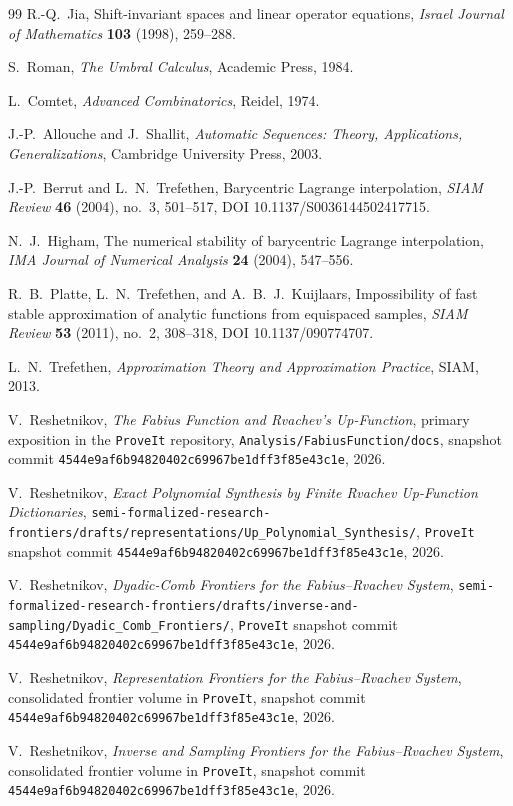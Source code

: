 \documentclass[11pt,oneside]{article}
\numberwithin{equation}{section}
\theoremstyle{definition}
\theoremstyle{remark}
\newcommand{\repo}{\nolinkurl{Analysis/FabiusFunction/docs}}
\begin{document}
\begin{thebibliography}{99}
R.-Q.~Jia,
\newblock Shift-invariant spaces and linear operator equations,
\newblock \emph{Israel Journal of Mathematics} \textbf{103} (1998),
259--288.

S.~Roman,
\newblock \emph{The Umbral Calculus},
\newblock Academic Press, 1984.

L.~Comtet,
\newblock \emph{Advanced Combinatorics},
\newblock Reidel, 1974.

J.-P.~Allouche and J.~Shallit,
\newblock \emph{Automatic Sequences: Theory, Applications,
Generalizations},
\newblock Cambridge University Press, 2003.

J.-P.~Berrut and L.~N.~Trefethen,
\newblock Barycentric Lagrange interpolation,
\newblock \emph{SIAM Review} \textbf{46} (2004), no.~3, 501--517,
DOI 10.1137/S0036144502417715.

N.~J.~Higham,
\newblock The numerical stability of barycentric Lagrange interpolation,
\newblock \emph{IMA Journal of Numerical Analysis} \textbf{24} (2004),
547--556.

R.~B.~Platte, L.~N.~Trefethen, and A.~B.~J.~Kuijlaars,
\newblock Impossibility of fast stable approximation of analytic functions
from equispaced samples,
\newblock \emph{SIAM Review} \textbf{53} (2011), no.~2, 308--318,
DOI 10.1137/090774707.

L.~N.~Trefethen,
\newblock \emph{Approximation Theory and Approximation Practice},
\newblock SIAM, 2013.

V.~Reshetnikov,
\newblock \emph{The Fabius Function and Rvachev's Up-Function},
\newblock primary exposition in the \texttt{ProveIt} repository,
\repo, snapshot commit
\nolinkurl{4544e9af6b94820402c69967be1dff3f85e43c1e}, 2026.

V.~Reshetnikov,
\newblock \emph{Exact Polynomial Synthesis by Finite Rvachev Up-Function
Dictionaries},
\newblock \nolinkurl{semi-formalized-research-frontiers/drafts/representations/Up_Polynomial_Synthesis/},
\texttt{ProveIt} snapshot commit
\nolinkurl{4544e9af6b94820402c69967be1dff3f85e43c1e}, 2026.

V.~Reshetnikov,
\newblock \emph{Dyadic-Comb Frontiers for the Fabius--Rvachev System},
\newblock \nolinkurl{semi-formalized-research-frontiers/drafts/inverse-and-sampling/Dyadic_Comb_Frontiers/},
\texttt{ProveIt} snapshot commit
\nolinkurl{4544e9af6b94820402c69967be1dff3f85e43c1e}, 2026.

V.~Reshetnikov,
\newblock \emph{Representation Frontiers for the Fabius--Rvachev System},
\newblock consolidated frontier volume in \texttt{ProveIt}, snapshot commit
\nolinkurl{4544e9af6b94820402c69967be1dff3f85e43c1e}, 2026.

V.~Reshetnikov,
\newblock \emph{Inverse and Sampling Frontiers for the Fabius--Rvachev
System},
\newblock consolidated frontier volume in \texttt{ProveIt}, snapshot commit
\nolinkurl{4544e9af6b94820402c69967be1dff3f85e43c1e}, 2026.

\end{thebibliography}
\end{document}
